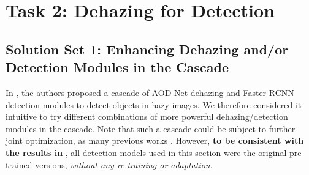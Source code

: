 \documentclass[10pt,twocolumn,letterpaper]{article}
\begin{document}
\section{Task 2: Dehazing for Detection}

\subsection{Solution Set 1: Enhancing Dehazing and/or Detection Modules in the Cascade}  %

In \cite{li2017aod}, the authors proposed a cascade of AOD-Net dehazing and Faster-RCNN \cite{ren2015faster} detection modules to detect objects in hazy images. We therefore considered it intuitive to try different combinations of more powerful dehazing/detection modules in the cascade. Note that such a cascade could be subject to further joint optimization, as many previous works \cite{liu2017image,cheng2017robust,li2017aod}. However, \textbf{to be consistent with the results in} \cite{li2017reside}, all detection models used in this section were the original pre-trained versions, \textit{without any re-training or adaptation}.
\end{document}
